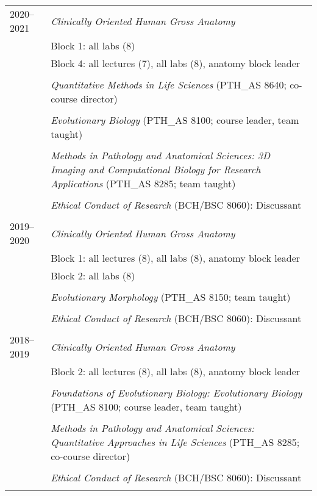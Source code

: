 \begin{longtable}{@{}lX@{}}
 2020--2021 & \textit{Clinically Oriented Human Gross Anatomy}\\
    & Block 1: all labs (8)\\
    & Block 4: all lectures (7), all labs (8), anatomy block leader\\
    \\
    & \textit{Quantitative Methods in Life Sciences} (PTH\_AS 8640; co-course director)\\
    \\
    & \textit{Evolutionary Biology} (PTH\_AS 8100; course leader, team taught)\\
    \\
    & \textit{Methods in Pathology and Anatomical Sciences: 3D Imaging and Computational Biology for Research Applications} (PTH\_AS 8285; team taught)\\
    \\
    & \textit{Ethical Conduct of Research} (BCH/BSC 8060): Discussant\\
    \\
  2019--2020 & \textit{Clinically Oriented Human Gross Anatomy}\\
    & Block 1: all lectures (8), all labs (8), anatomy block leader\\
    & Block 2: all labs (8)\\
    \\
    & \textit{Evolutionary Morphology} (PTH\_AS 8150; team taught)\\
    \\
    & \textit{Ethical Conduct of Research} (BCH/BSC 8060): Discussant\\
    \\
  2018--2019 & \textit{Clinically Oriented Human Gross Anatomy}\\
    & Block 2: all lectures (8), all labs (8), anatomy block leader\\
    \\
    & \textit{Foundations of Evolutionary Biology: Evolutionary Biology} (PTH\_AS 8100; course leader, team taught)\\
    \\
    & \textit{Methods in Pathology and Anatomical Sciences: Quantitative Approaches in Life Sciences} (PTH\_AS 8285; co-course director)\\
    \\
    & \textit{Ethical Conduct of Research} (BCH/BSC 8060): Discussant\\
    \\

\end{longtable}
